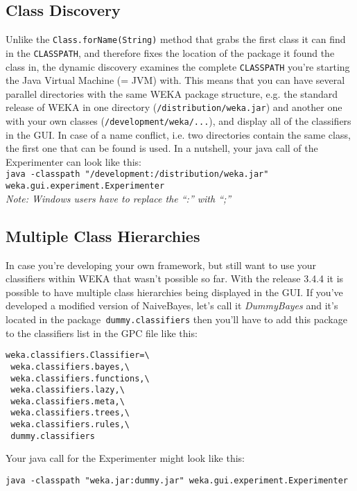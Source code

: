 \subsection{Class Discovery}
Unlike the \verb=Class.forName(String)= method that grabs the first class it
can find in the \verb=CLASSPATH=, and therefore fixes the location of the
package it found the class in, the dynamic discovery examines the
complete \verb=CLASSPATH= you're starting the Java Virtual Machine (= JVM)
with. This means that you can have several parallel directories with
the same WEKA package structure, e.g. the standard release of WEKA in
one directory (\verb=/distribution/weka.jar=) and another one with your own
classes (\verb=/development/weka/...=), and display all of the classifiers in
the GUI. In case of a name conflict, i.e. two directories contain the
same class, the first one that can be found is used. In a nutshell,
your java call of the Experimenter can look like this:\\

\verb=java -classpath "/development:/distribution/weka.jar" weka.gui.experiment.Experimenter=\\

\noindent \textit{Note: Windows users have to replace the ``:'' with ``;''}\\

\subsection{Multiple Class Hierarchies}
In case you're developing your own framework, but still want to use
your classifiers within WEKA that wasn't possible so far. With the
release 3.4.4 it is possible to have multiple class hierarchies being
displayed in the GUI. If you've developed a modified version of NaiveBayes,
let's call it \textit{DummyBayes} and it's located in the package\verb= dummy.classifiers=
then you'll have to add this package to the classifiers list in the
GPC file like this:

\begin{verbatim}
weka.classifiers.Classifier=\
 weka.classifiers.bayes,\
 weka.classifiers.functions,\
 weka.classifiers.lazy,\
 weka.classifiers.meta,\
 weka.classifiers.trees,\
 weka.classifiers.rules,\
 dummy.classifiers
\end{verbatim}

\noindent Your java call for the Experimenter might look like this:

\verb=java -classpath "weka.jar:dummy.jar" weka.gui.experiment.Experimenter=\\

